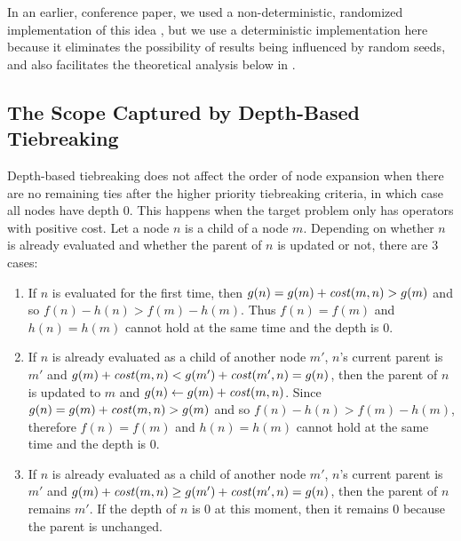 In an earlier, conference paper, we used a non-deterministic,
randomized implementation of this idea \cite{Asai2016}, but we use a deterministic
implementation here because it eliminates the possibility of results being influenced by random seeds,
and also facilitates the  theoretical analysis below in .


\subsection{The Scope Captured by Depth-Based Tiebreaking}

Depth-based tiebreaking does not affect the order of node expansion when there are no remaining ties after the
higher priority tiebreaking criteria, in which case all nodes have depth 0. 
% 
This happens when the target problem only has operators with positive cost.
Let a node $n$ is a child of a node $m$. Depending on whether $n$ is already evaluated and whether the parent of $n$ is updated or not, there are 3 cases:

\begin{enumerate}
 \item If $n$ is evaluated for the first time,
       then $g(n)=g(m)+\mit{cost}(m,n) > g(m)$ and so $f(n)-h(n) > f(m)-h(m)$.
       Thus $f(n)=f(m)$ and $h(n)=h(m)$ cannot hold at the same time and the depth is 0.
 \item If $n$ is already evaluated as a child of another node $m'$, $n$'s current parent is $m'$ and
       $g(m)+\mit{cost}(m,n) < g(m') + \mit{cost}(m',n) = g(n)$,
       then the parent of $n$ is updated to $m$ and $g(n)\leftarrow g(m)+\mit{cost}(m,n)$.
       Since $g(n)=g(m)+\mit{cost}(m,n)>g(m)$ and so $f(n)-h(n) > f(m)-h(m)$,
       therefore $f(n)=f(m)$ and $h(n)=h(m)$ cannot hold at the same time and the depth is 0.
 \item If $n$ is already evaluated as a child of another node $m'$, $n$'s current parent is $m'$ and
       $g(m)+\mit{cost}(m,n) \geq g(m') + \mit{cost}(m',n) = g(n)$, then the parent of $n$ remains $m'$. If the
       depth of $n$ is 0 at this moment, then it remains 0 because the parent is unchanged.
\end{enumerate}


